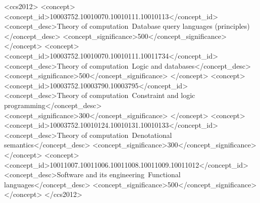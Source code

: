 \documentclass[acmsmall,]{acmart}\settopmatter{printfolios=true,printccs=false,printacmref=false}
\begin{document}

 \begin{CCSXML}
<ccs2012>
<concept>
<concept_id>10003752.10010070.10010111.10010113</concept_id>
<concept_desc>Theory of computation~Database query languages (principles)</concept_desc>
<concept_significance>500</concept_significance>
</concept>
<concept>
<concept_id>10003752.10010070.10010111.10011734</concept_id>
<concept_desc>Theory of computation~Logic and databases</concept_desc>
<concept_significance>500</concept_significance>
</concept>
<concept>
<concept_id>10003752.10003790.10003795</concept_id>
<concept_desc>Theory of computation~Constraint and logic programming</concept_desc>
<concept_significance>300</concept_significance>
</concept>
<concept>
<concept_id>10003752.10010124.10010131.10010133</concept_id>
<concept_desc>Theory of computation~Denotational semantics</concept_desc>
<concept_significance>300</concept_significance>
</concept>
<concept>
<concept_id>10011007.10011006.10011008.10011009.10011012</concept_id>
<concept_desc>Software and its engineering~Functional languages</concept_desc>
<concept_significance>500</concept_significance>
</concept>
</ccs2012>
\end{CCSXML}




\maketitle
\end{document}
